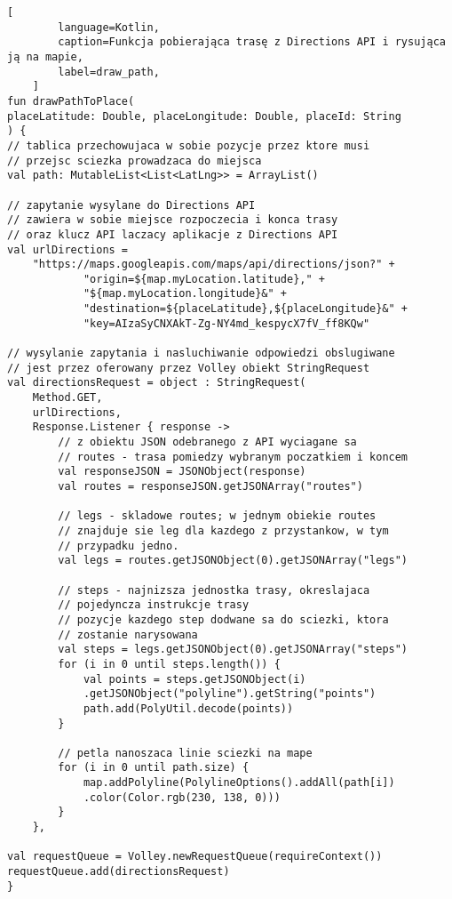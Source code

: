 \newpage
    \begin{lstlisting}[
        language=Kotlin, 
        caption=Funkcja pobierająca trasę z Directions API i rysująca ją na mapie, 
        label=draw_path,
    ]
fun drawPathToPlace(
placeLatitude: Double, placeLongitude: Double, placeId: String
) {
// tablica przechowujaca w sobie pozycje przez ktore musi 
// przejsc sciezka prowadzaca do miejsca
val path: MutableList<List<LatLng>> = ArrayList()

// zapytanie wysylane do Directions API
// zawiera w sobie miejsce rozpoczecia i konca trasy
// oraz klucz API laczacy aplikacje z Directions API
val urlDirections =
    "https://maps.googleapis.com/maps/api/directions/json?" +
            "origin=${map.myLocation.latitude}," +
            "${map.myLocation.longitude}&" +
            "destination=${placeLatitude},${placeLongitude}&" +
            "key=AIzaSyCNXAkT-Zg-NY4md_kespycX7fV_ff8KQw"

// wysylanie zapytania i nasluchiwanie odpowiedzi obslugiwane 
// jest przez oferowany przez Volley obiekt StringRequest
val directionsRequest = object : StringRequest(
    Method.GET,
    urlDirections,
    Response.Listener { response ->
        // z obiektu JSON odebranego z API wyciagane sa
        // routes - trasa pomiedzy wybranym poczatkiem i koncem
        val responseJSON = JSONObject(response)
        val routes = responseJSON.getJSONArray("routes")

        // legs - skladowe routes; w jednym obiekie routes
        // znajduje sie leg dla kazdego z przystankow, w tym
        // przypadku jedno.
        val legs = routes.getJSONObject(0).getJSONArray("legs")

        // steps - najnizsza jednostka trasy, okreslajaca  
        // pojedyncza instrukcje trasy
        // pozycje kazdego step dodwane sa do sciezki, ktora 
        // zostanie narysowana
        val steps = legs.getJSONObject(0).getJSONArray("steps")
        for (i in 0 until steps.length()) {
            val points = steps.getJSONObject(i)
            .getJSONObject("polyline").getString("points")
            path.add(PolyUtil.decode(points))
        }

        // petla nanoszaca linie sciezki na mape
        for (i in 0 until path.size) {
            map.addPolyline(PolylineOptions().addAll(path[i])
            .color(Color.rgb(230, 138, 0)))
        }
    },

val requestQueue = Volley.newRequestQueue(requireContext())
requestQueue.add(directionsRequest)
}
\end{lstlisting}
